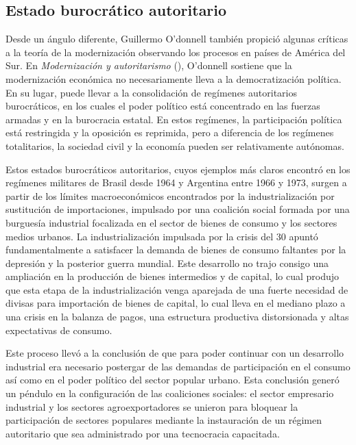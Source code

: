 \documentclass{article}
\begin{document}
\subsection{Estado burocrático autoritario}

Desde un ángulo diferente, Guillermo O'donnell también propició algunas críticas a la 
teoría de la modernización observando los procesos en países de América del Sur. 
En \textit{Modernización y autoritarismo} (\citeyear{o1972modernizacion}), O'donnell
sostiene que la modernización económica no necesariamente lleva a la democratización
política. En su lugar, puede llevar a la consolidación de regímenes autoritarios
burocráticos, en los cuales el poder político está concentrado en las fuerzas armadas
y en la burocracia estatal. En estos regímenes, la participación política está
restringida y la oposición es reprimida, pero a diferencia de los regímenes totalitarios,
la sociedad civil y la economía pueden ser relativamente autónomas.

Estos estados burocráticos autoritarios, cuyos ejemplos más claros encontró en los
regímenes militares de Brasil desde 1964 y Argentina entre 1966 y 1973, surgen a partir
de los límites macroeconómicos encontrados por la industrialización por sustitución de
importaciones, impulsado por una coalición social formada por una burguesía industrial
focalizada en el sector de bienes de consumo y los sectores medios urbanos. La 
industrialización impulsada por la crisis del 30 apuntó fundamentalmente a satisfacer
la demanda de bienes de consumo faltantes por la depresión y la posterior guerra mundial.
Este desarrollo no trajo consigo una ampliación en la producción de bienes intermedios y de
capital, lo cual produjo que esta etapa de la industrialización venga aparejada de una 
fuerte necesidad de divisas para importación de bienes de capital, lo cual lleva en el
mediano plazo a una crisis en la balanza de pagos, una estructura productiva distorsionada
y altas expectativas de consumo.

Este proceso llevó a la conclusión de que para poder continuar con un desarrollo 
industrial era necesario postergar de las demandas de participación en el consumo
así como en el poder político del sector popular urbano. Esta conclusión generó un péndulo
en la configuración de las coaliciones sociales: el sector empresario industrial y los
sectores agroexportadores se unieron para bloquear la participación de sectores populares
mediante la instauración de un régimen autoritario que sea administrado por una tecnocracia
capacitada.
\end{document}
